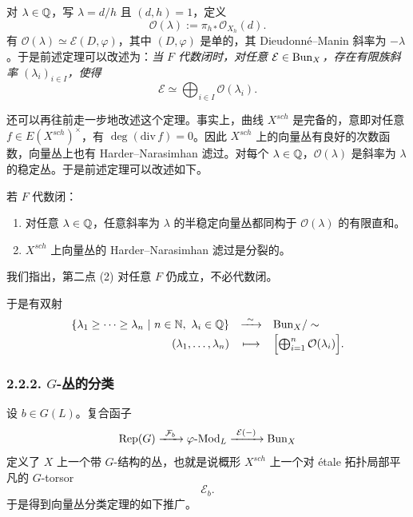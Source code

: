 

对 $\lambda\in\mathbb{Q}$，写 $\lambda=d/h$ 且 $(d,h)=1$，定义
\[
\mathcal{O}(\lambda):=\pi_{h*}\mathcal{O}_{X_h}(d).
\]
有 $\mathcal{O}(\lambda)\simeq\mathcal{E}(D,\varphi)$，其中 $(D,\varphi)$ 是单的，其 Dieudonné–Manin 斜率为 $-\lambda$。于是前述定理可以改述为：\emph{当 $F$ 代数闭时，对任意 $\mathcal{E}\in\mathrm{Bun}_X$，存在有限族斜率 $(\lambda_i)_{i\in I}$，使得}
\[
\mathcal{E}\simeq\bigoplus_{i\in I}\mathcal{O}(\lambda_i).
\]

还可以再往前走一步地改述这个定理。事实上，曲线 $X^{sch}$ 是完备的，意即对任意 $f\in E(X^{sch})^\times$，有 $\deg(\mathrm{div}\,f)=0$。因此 $X^{sch}$ 上的向量丛有良好的次数函数，向量丛上也有 Harder–Narasimhan 滤过。对每个 $\lambda\in\mathbb{Q}$，$\mathcal{O}(\lambda)$ 是斜率为 $\lambda$ 的稳定丛。于是前述定理可以改述如下。

\begin{theorem}\label{thm:2.12}
若 $F$ 代数闭：
\begin{enumerate}[label=(\arabic*),leftmargin=*]
\item 对任意 $\lambda\in\mathbb{Q}$，任意斜率为 $\lambda$ 的半稳定向量丛都同构于 $\mathcal{O}(\lambda)$ 的有限直和。
\item $X^{sch}$ 上向量丛的 Harder–Narasimhan 滤过是分裂的。
\end{enumerate}
\end{theorem}

我们指出，第二点 (2) 对任意 $F$ 仍成立，不必代数闭。

于是有双射
\[
\begin{array}{rcl}
\{\lambda_1\ge\cdots\ge\lambda_n\ |\ n\in\mathbb{N},\ \lambda_i\in\mathbb{Q}\} & \xrightarrow{\ \sim\ } & \mathrm{Bun}_X/\sim\\[2pt]
(\lambda_1,\dots,\lambda_n) & \longmapsto & \Bigl[\bigoplus_{i=1}^{n}\mathcal{O}(\lambda_i)\Bigr].
\end{array}
\]

\subsubsection*{2.2.2. $G$-丛的分类}%

设 $b\in G(L)$。复合函子
\[
\Rep(G)\xrightarrow{\ \mathcal{F}_b\ }\varphi\text{-}\mathrm{Mod}_L\xrightarrow{\ \mathcal{E}(-)\ }\Bun_X
\]
定义了 $X$ 上一个带 $G$-结构的丛，也就是说概形 $X^{sch}$ 上一个对 étale 拓扑局部平凡的 $G$-torsor
\[
\mathcal{E}_b.
\]
于是得到向量丛分类定理的如下推广。

